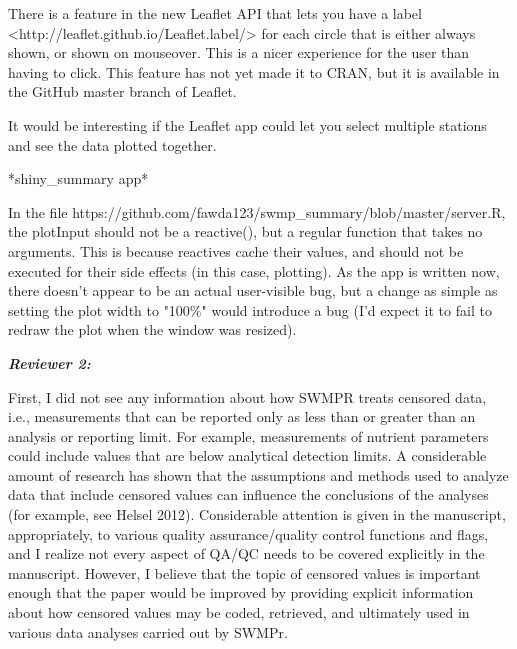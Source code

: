 \documentclass[letterpaper,12pt]{article}\usepackage[]{graphicx}\usepackage[]{color}
\newcommand{\Bigtxt}[1]{\textbf{\textit{#1}}}
\begin{document}
There is a feature in the new Leaflet API that lets you have a label <http://leaflet.github.io/Leaflet.label/> for each circle that is either always shown, or shown on mouseover. This is a nicer experience for the user than having to click. This feature has not yet made it to CRAN, but it is available in the GitHub master branch of Leaflet.

It would be interesting if the Leaflet app could let you select multiple stations and see the data plotted together.

*shiny\_summary app*

In the file https://github.com/fawda123/swmp\_summary/blob/master/server.R, the plotInput should not be a reactive(), but a regular function that takes no arguments. This is because reactives cache their values, and should not be executed for their side effects (in this case, plotting). As the app is written now, there doesn't appear to be an actual user-visible bug, but a change as simple as setting the plot width to "100\%" would introduce a bug (I'd expect it to fail to redraw the plot when the window was resized).

\Bigtxt{Reviewer 2:}

First, I did not see any information about how SWMPR treats censored data, i.e., measurements that can be reported only as less than or greater than an analysis or reporting limit. For example, measurements of nutrient parameters could include values that are below analytical detection limits. A considerable amount of research has shown that the assumptions and methods used to analyze data that include censored values can influence the conclusions of the analyses (for example, see Helsel 2012). Considerable attention is given in the manuscript, appropriately, to various quality assurance/quality control functions and flags, and I realize not every aspect of QA/QC needs to be covered explicitly in the manuscript. However, I believe that the topic of censored values is important enough that the paper would be improved by providing explicit information about how censored values may be coded, retrieved, and ultimately used in various data analyses carried out by SWMPr.
\end{document}
